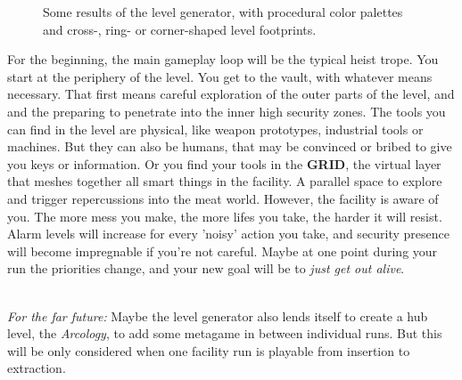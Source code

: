 \documentclass[11pt,a4paper]{article}
\begin{document}
\begin{figure}
    \caption{Some results of the level generator, with procedural color palettes and cross-, ring- or corner-shaped
            level footprints.}
\end{figure}

For the beginning, the main gameplay loop will be the typical heist trope. You start at the periphery of the level.
You get to the vault, with whatever means necessary. That first means careful exploration of the outer parts of the
level, and and the preparing to penetrate into the inner high security zones.
The tools you can find in the level are physical, like weapon prototypes, industrial tools or machines. But they can
also be humans, that may be convinced or bribed to give you keys or information. Or you find your tools in the
\textbf{GRID}, the virtual layer that meshes together all smart things in the facility. A parallel space to explore
and trigger repercussions into the meat world.
However, the facility is aware of you. The more mess you make, the more lifes you take, the harder it will resist.
Alarm levels will increase for every 'noisy' action you take, and security presence will become impregnable if you're
not careful. Maybe at one point during your run the priorities change, and your new goal will be to
\textit{just get out alive}.\\  \

\textit{For the far future:} Maybe the level generator also lends itself to create a hub level, the \textit{Arcology}, to add
some metagame in between individual runs. But this will be only considered when one facility run is playable from
insertion to extraction.

%
%
%
\end{document}
